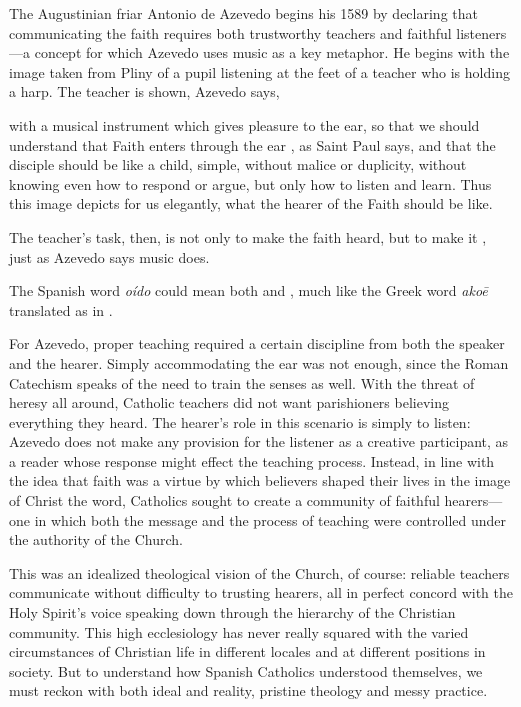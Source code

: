The Augustinian friar Antonio de Azevedo begins his 1589  by declaring that communicating the faith requires
both trustworthy teachers and faithful listeners---a concept for which Azevedo
uses music as a key metaphor.%
    \Autocite{Azevedo:Catecismo}
He begins with the image taken from Pliny of a pupil listening at the feet of a
teacher who is holding a harp.
The teacher is shown, Azevedo says,
\begin{quoting}
    with a musical instrument which gives pleasure to the ear, so that we should
    understand that Faith enters through the ear , as Saint Paul
    says, and that the disciple should be like a child, simple, without malice
    or duplicity, without knowing even how to respond or argue, but only how to
    listen and learn.
    Thus this image depicts for us elegantly, what the hearer of the Faith
    should be like.%
        \Autocite[]{Azevedo:Catecismo}
\end{quoting}
The teacher's task, then, is not only to make the faith heard, but to make it
, just as Azevedo says music does.%
\begin{Footnote}
    The Spanish word \emph{oído} could mean both  and ,
    much like the Greek word \emph{akoē} translated as  in
    .
\end{Footnote}
For Azevedo, proper teaching required a certain discipline from both the speaker
and the hearer.
Simply accommodating the ear was not enough, since the Roman Catechism speaks of
the need to train the senses as well.
With the threat of heresy all around, Catholic teachers did not want
parishioners believing everything they heard.
The hearer's role in this scenario is simply to listen: Azevedo does not make
any provision for the listener as a creative participant, as a reader whose
response might effect the teaching process.
Instead, in line with the idea that faith was a virtue by which believers shaped
their lives in the image of Christ the word, Catholics sought to create a
community of faithful hearers---one in which both the message and the process of
teaching were controlled under the authority of the Church.

This was an idealized theological vision of the Church, of course: reliable
teachers communicate without difficulty to trusting hearers, all in perfect
concord with the Holy Spirit's voice speaking down through the hierarchy of the
Christian community.
This high ecclesiology has never really squared with the varied circumstances of
Christian life in different locales and at different positions in society.
But to understand how Spanish Catholics understood themselves, we must reckon
with both ideal and reality, pristine theology and messy practice.

